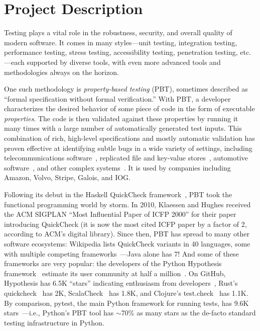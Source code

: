 \section*{Project Description}

Testing plays a vital role in the robustness, security, and overall
quality of modern software. It comes in many styles---unit testing,
integration testing, performance testing, stress testing,
accessibility testing, penetration testing, etc.---each supported by
diverse tools, with even more advanced tools and methodologies always on
the horizon.

One such methodology is {\em property-based testing} (PBT),
sometimes described as ``formal specification without formal
verification.''  With PBT, a developer characterizes the desired
behavior of
some piece of code in the form of executable {\em
  properties}. The code is
then validated against these properties by running it many times
with a large number of automatically generated test
inputs.
%
This combination of rich, high-level specifications and mostly
automatic validation has proven effective at identifying
subtle bugs in a wide variety of settings, including
telecommunications software~\cite{arts2006testing}, replicated
file and key-value
stores~\cite{MysteriesOfDropbox2016,Bornholt2021}, automotive
software~\cite{arts2015testing}, and other complex
systems~\cite{hughes_experiences_2016}.
It is used by companies including Amazon, Volvo, Stripe, Galois,
and IOG.

Following its
debut in the Haskell QuickCheck framework~\cite{ClaessenHughes00}, PBT
took the functional programming world by storm.  In
2010, Klaessen and Hughes received the ACM SIGPLAN ``Most Influential Paper of ICFP
2000'' for their paper introducing QuickCheck (it is now the most cited
ICFP paper by
a factor of 2, according to ACM's digital library).  Since then,
PBT has spread to many other software ecosystems:
%
Wikipedia lists QuickCheck variants in 40 languages, some
with multiple competing frameworks~\cite{QuickCheckWikipedia}---Java alone has
7!
%
And some of these frameworks are very popular:
the developers of the Python Hypothesis framework~\cite{maciver2019hypothesis,HypothesisGithub} estimate its user community
at half a million~\cite{ZacPersonalCommunication,noauthor_python_nodate}.  On GitHub,
Hypothesis has 6.5K ``stars'' indicating enthusiasm from developers~\cite{borges_whats_2018}, Rust's
quickcheck~\cite{RustQuickcheckGithub} has 2K,
ScalaCheck~\cite{ScalaCheckGithub} has 1.8K, and Clojure's
test.check~\cite{ClojureTest.checkGithub} has 1.1K.
By comparison, pytest, the main Python framework for running
tests, has 9.6K stars~\cite{PytestGitHub}---i.e., Python's PBT tool has
$\sim$70\% as many stars as the de-facto standard testing infrastructure in
Python.

